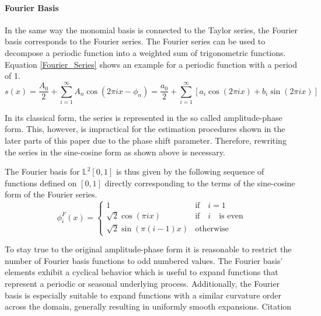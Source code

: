 \documentclass[11pt,twoside,a4paper]{article}
\begin{document}
	\paragraph{Fourier Basis}
	In the same way the monomial basis is connected to the Taylor series, the Fourier basis corresponds to the Fourier series. The Fourier series can be used to decompose a periodic function into a weighted sum of trigonometric functions. Equation \ref{Fourier_Series} shows an example for a periodic function with a period of 1.
	\begin{equation}\label{Fourier_Series}
		s(x) = \frac{A_0}{2} + \sum_{i = 1}^{\infty} A_n \cos(2\pi i x - \phi_n) = \frac{a_0}{2} + \sum_{i = 1}^{\infty}\left[a_i \cos(2\pi i x) + b_i \sin(2\pi i x)\right]
	\end{equation}
	
	In its classical form, the series is represented in the so called amplitude-phase form. This, however, is impractical for the estimation procedures shown in the later parts of this paper due to the phase shift parameter. Therefore, rewriting the series in the sine-cosine form as shown above is necessary. 
	
	The Fourier basis for $\mathbb{L}^2[0,1]$ is thus given by the following sequence of functions defined on $[0,1]$ directly corresponding to the terms of the sine-cosine form of the Fourier series.
	\begin{equation}
		\phi_{i}^{F}(x) = 
		\begin{cases}
			1 & \text{if} \quad i = 1\\
			\sqrt{2} \cos(\pi i x) & \text{if} \quad i \quad \text{is even} \\
			\sqrt{2} \sin(\pi (i-1)x) & \text{otherwise}
		\end{cases}
	\end{equation}

	To stay true to the original amplitude-phase form it is reasonable to restrict the number of Fourier basis functions to odd numbered values. The Fourier basis' elements exhibit a cyclical behavior which is useful to expand functions that represent a periodic or seasonal underlying process. Additionally, the Fourier basis is especially suitable to expand functions with a similar curvature order across the domain, generally resulting in uniformly smooth expansions. {\color{red} Citation}
	\vspace{-0.2cm}
\end{document}
